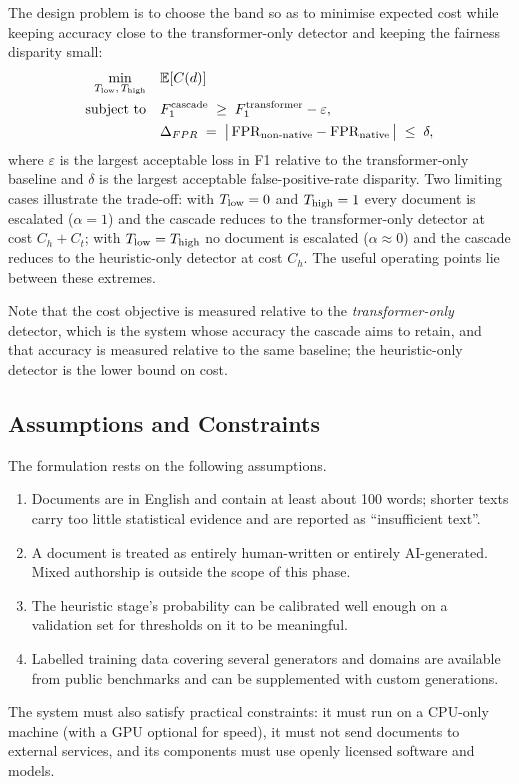 The design problem is to choose the band so as to minimise expected cost
while keeping accuracy close to the transformer-only detector and keeping the
fairness disparity small:
\begin{equation}
\begin{aligned}
  \min_{T_{\mathrm{low}},\,T_{\mathrm{high}}}\quad & \mathbb{E}[C(d)] \\
  \text{subject to}\quad & F_1^{\text{cascade}} \;\ge\; F_1^{\text{transformer}} - \varepsilon, \\
  & \Delta_{FPR} \;=\; \big|\,\mathrm{FPR}_{\text{non-native}} - \mathrm{FPR}_{\text{native}}\,\big| \;\le\; \delta ,
\end{aligned}
\label{eq:optproblem}
\end{equation}
where $\varepsilon$ is the largest acceptable loss in F1 relative to the
transformer-only baseline and $\delta$ is the largest acceptable
false-positive-rate disparity. Two limiting cases illustrate the trade-off:
with $T_{\mathrm{low}} = 0$ and $T_{\mathrm{high}} = 1$ every document is escalated ($\alpha=1$) and
the cascade reduces to the transformer-only detector at cost $C_h + C_t$;
with $T_{\mathrm{low}} = T_{\mathrm{high}}$ no document is escalated ($\alpha \approx 0$) and the
cascade reduces to the heuristic-only detector at cost $C_h$. The useful
operating points lie between these extremes.

Note that the cost objective is measured relative to the
\emph{transformer-only} detector, which is the system whose accuracy the
cascade aims to retain, and that accuracy is measured relative to the same
baseline; the heuristic-only detector is the lower bound on cost.

\subsection{Assumptions and Constraints}

The formulation rests on the following assumptions.
\begin{enumerate}
  \item Documents are in English and contain at least about 100 words; shorter
        texts carry too little statistical evidence and are reported as
        ``insufficient text''.
  \item A document is treated as entirely human-written or entirely
        AI-generated. Mixed authorship is outside the scope of this phase.
  \item The heuristic stage's probability can be calibrated well enough on a
        validation set for thresholds on it to be meaningful.
  \item Labelled training data covering several generators and domains are
        available from public benchmarks and can be supplemented with custom
        generations.
\end{enumerate}
The system must also satisfy practical constraints: it must run on a
CPU-only machine (with a GPU optional for speed), it must not send documents
to external services, and its components must use openly licensed software and
models.

